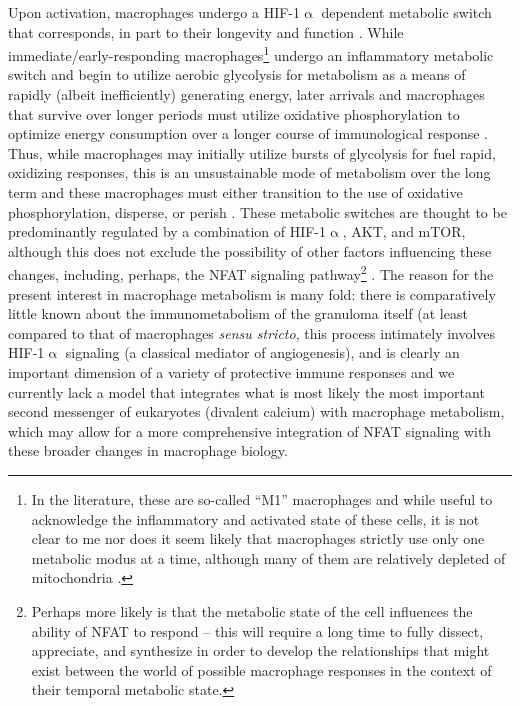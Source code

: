 Upon activation, macrophages undergo a HIF\hyp{}1$\upalpha$ dependent metabolic switch that corresponds, in part to their longevity and function \citep{Kolliniati2022}. While immediate/early\hyp{}responding macrophages\footnote{In the literature, these are so\hyp{}called ``M1'' macrophages and while useful to acknowledge the inflammatory and activated state of these cells, it is not clear to me nor does it seem likely that macrophages strictly use only one metabolic modus at a time, although many of them are relatively depleted of mitochondria \citep{Biswas2012}.} undergo an inflammatory metabolic switch and begin to utilize aerobic glycolysis for metabolism as a means of rapidly (albeit inefficiently) generating energy, later arrivals and macrophages that survive over longer periods must utilize oxidative phosphorylation to optimize energy consumption over a longer course of immunological response \citep{Shi2019, Kiran2016, Viola2019, Langston2017, Taylor2022}. Thus, while macrophages may initially utilize  bursts of glycolysis for fuel rapid, oxidizing responses, this is an unsustainable mode of metabolism over the long term and these macrophages must either transition to the use of oxidative phosphorylation, disperse, or perish \citep{Odegaard2011, Howard2020}. These metabolic switches are thought to be predominantly regulated by a combination of HIF\hyp{}1$\upalpha$, AKT, and mTOR, although this does not exclude the possibility of other factors influencing these changes, including, perhaps, the NFAT signaling pathway\footnote{Perhaps more likely is that the metabolic state of the cell influences the ability of NFAT to respond -- this will require a long time to fully dissect, appreciate, and synthesize in order to develop the relationships that might exist between the world of possible macrophage responses in the context of their temporal metabolic state.} \citep{Covarrubias2015, Karar2011}. The reason for the present interest in macrophage metabolism is many fold: there is comparatively little known about the immunometabolism of the granuloma itself (at least compared to that of macrophages \textit{sensu stricto}, this process intimately involves HIF\hyp{}1$\upalpha$ signaling (a classical mediator of angiogenesis), and is clearly an important dimension of a variety of protective immune responses and we currently lack a model that integrates what is most likely the most important second messenger of eukaryotes (divalent calcium) with macrophage metabolism, which may allow for a more comprehensive integration of NFAT signaling with these broader changes in macrophage biology. 

